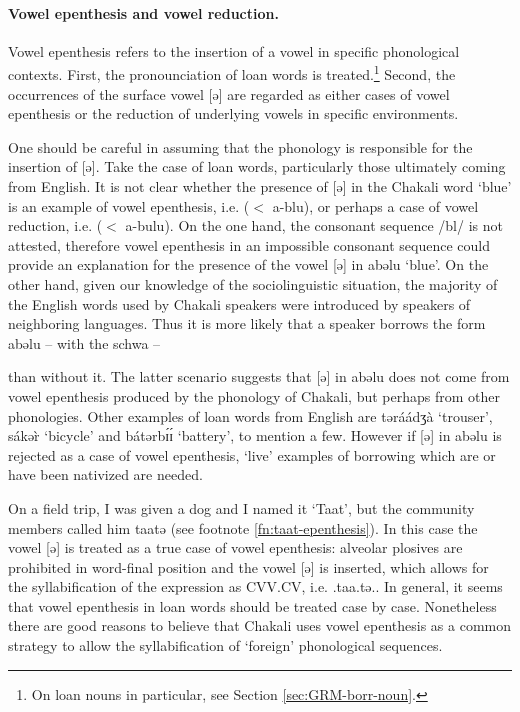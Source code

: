 \paragraph{Vowel epenthesis and vowel reduction.}
\label{sec:epenthesis}


Vowel epenthesis refers to the insertion of a vowel in specific phonological
contexts. First,  the pronounciation of loan words is treated.\footnote{On  loan
nouns in particular, see Section \ref{sec:GRM-borr-noun}.}  Second,  the
occurrences of the surface vowel [{\sls ə}] are regarded as  either cases of 
vowel
epenthesis or the reduction of  underlying vowels in specific environments. 


One should be careful in assuming that  the  phonology   is responsible for
the insertion of  [{\sls ə}].  Take the case of loan words,
particularly those ultimately coming  from  English. It is not clear whether the
presence of [{\sls ə}] in the Chakali
word {\sls [ábəlù]}  `blue'  is an example of vowel epenthesis, i.e.  ($<$ 
{\sls a-blu}),  or perhaps a case of vowel reduction, i.e.  ($<$ {\sls 
a-bulu}).  
On the one hand, the 
consonant sequence  /bl/ is not attested, therefore  vowel
epenthesis 
in an impossible consonant sequence  could  provide an explanation for the
presence
of  the vowel [{\sls ə}] in {\sls abəlu} `blue'.  On the other hand, given 
our 
knowledge
of the sociolinguistic situation,  the majority of the English words used by 
Chakali speakers   were introduced by speakers of neighboring languages. Thus it 
is more likely that a speaker borrows the form {\sls abəlu} -- with the schwa -- 
 
than without it. The latter scenario suggests that  [{\sls ə}] in {\sls 
abəlu} 
does not come from vowel epenthesis produced by the phonology of Chakali, but 
perhaps from other phonologies.  Other examples of loan words from English are 
{\sls təráádʒà} `trouser',  {\sls sákər̀} `bicycle' and  {\sls bátərbɪ́ɪ́} 
`battery', to mention a few. However if   [{\sls ə}]  in {\sls abəlu} is 
rejected as a case of vowel epenthesis, `live' examples of borrowing  which are 
or have been nativized are needed.

On a field trip, I was given a dog  and I named it  `Taat', but the community 
members called him {\sls taatə} (see footnote \ref{fn:taat-epenthesis}). In 
this 
case the  vowel  [{\sls ə}] is treated as a true case of vowel epenthesis: 
alveolar plosives are prohibited in word-final position and the   vowel  
[{\sls ə}] is  inserted, which allows for the syllabification of the 
expression as CVV.CV, i.e. {\sls .taa.tə.}.  In general, it seems that vowel 
epenthesis in loan words should be treated case by case. Nonetheless there are 
good reasons to believe that Chakali uses vowel epenthesis as a common strategy 
to allow the syllabification of  `foreign' phonological sequences. 



